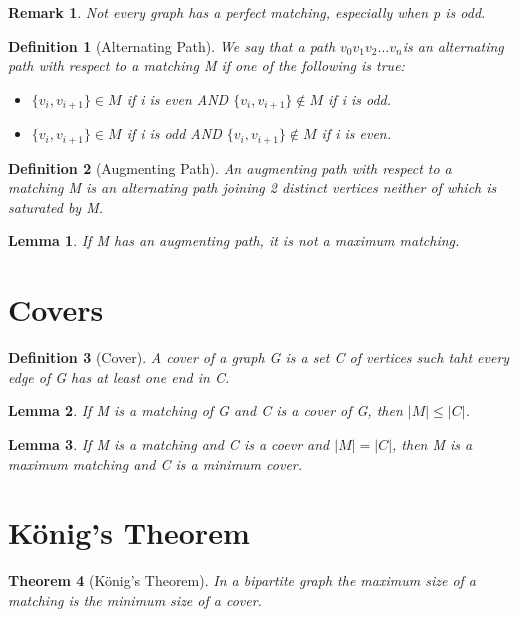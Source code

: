 \documentclass[11pt, oneside]{book}
\theoremstyle{break}
\newtheorem{thm}{Theorem}[section]
\newtheorem{lemma}[thm]{Lemma}
\newtheorem{defn}{Definition}[section]
\newtheorem*{remark}{Remark}
\begin{document}
\begin{remark}
	Not every graph has a perfect matching, especially when p is odd.
\end{remark}

\begin{defn}[Alternating Path]
	We say that a path $v_0v_1v_2\hdots v_n$is an alternating path with respect to a matching M if one of the following is true:
	\begin{itemize}
		\item $\{v_i, v_{i+1}\} \in M$ if i is even AND $\{v_i, v_{i+1}\} \notin M$ if i is odd.
		\item $\{v_i, v_{i+1}\} \in M$ if i is odd AND $\{v_i, v_{i+1}\} \notin M$ if i is even.
	\end{itemize}
\end{defn}

\begin{defn}[Augmenting Path]
	An augmenting path with respect to a matching M is an alternating path joining 2 distinct vertices neither of which is saturated by M.
\end{defn}

\begin{lemma}
	If M has an augmenting path, it is not a maximum matching.
\end{lemma}


\section{Covers}

\begin{defn}[Cover]
	A cover of a graph G is a set C of vertices such taht every edge of G has at least one end in C.
\end{defn}

\begin{lemma}
	If M is a matching of G and C is a cover of G, then $|M| \leq |C|$.
\end{lemma}

\begin{lemma}
	If M is a matching and C is a coevr and $|M| = |C|$, then M is a maximum matching and C is a minimum cover.
\end{lemma}


\section{König's Theorem}

\begin{thm}[König's Theorem]
	In a bipartite graph the maximum size of a matching is the minimum size of a cover.
\end{thm}
\end{document}
